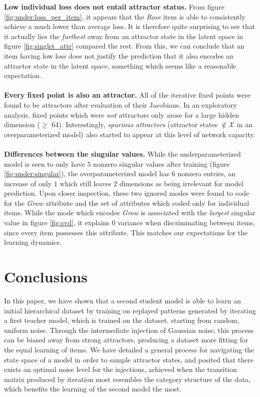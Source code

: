 \documentclass[11pt]{article}
\theoremstyle{remark}
\begin{document}
\textbf{Low individual loss does not entail attractor status.} From figure \ref{fig:under:loss_per_item}, it appears that the \textit{Rose} item is able to consistently achieve a much lower than average loss. It is therefore quite surprising to see that it actually lies the \textit{furthest} away from an attractor state in the latent space in figure \ref{fig:singlet_attr} compared the rest. From this, we can conclude that an item having low loss does not justify the prediction that it also encodes an attractor state in the latent space, something which seems like a reasonable expectation.
\\
\\
\textbf{Every fixed point is also an attractor.} All of the iterative fixed points were found to be attractors after evaluation of their Jacobians. In an exploratory analysis, fixed points which were \textit{not} attractors only arose for a large hidden dimension ($\geq$ 64). Interestingly, \textit{spurious attractors} (attractor states $\notin \mathcal{X}$ in an overparameterized model) also started to appear at this level of network capacity.
\\
\\
\textbf{Differences between the singular values.} While the underparameterized model is seen to only have $5$ nonzero singular values after training (figure \ref{fig:under:singular}), the overparameterized model has $6$ nonzero entries, an increase of only $1$ which still leaves $2$ dimensions as being irrelevant for model prediction. Upon closer inspection, these two ignored modes were found to code for the \textit{Grow} attribute and the set of attributes which coded only for individual items. While the mode which encodes \textit{Grow} is associated with the \textit{largest} singular value in figure \ref{fig:svd}, it explains $0$ variance when discriminating between items, since every item possesses this attribute. This matches our expectations for the learning dynamics.

\section{Conclusions}

In this paper, we have shown that a second student model is able to learn an initial hierarchical dataset by training on replayed patterns generated by iterating a first teacher model, which is trained on the dataset, starting from random, uniform noise. Through the intermediate injection of Gaussian noise, this process can be biased away from strong attractors, producing a dataset more fitting for the equal learning of items. We have detailed a general process for navigating the state space of a model in order to sample attractor states, and posited that there exists an optimal noise level for the injections, achieved when the transition matrix produced by iteration most resembles the category structure of the data, which benefits the learning of the second model the most.
\end{document}
